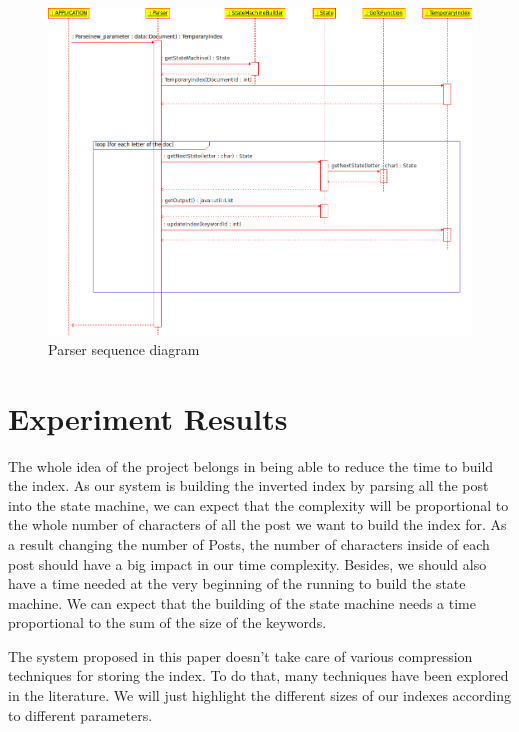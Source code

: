 \documentclass[10pt]{report}
\begin{document}
\begin{figure}
  \begin{center}
        \includegraphics[width=\textwidth,height=!]{parsersequencediagram}
  \end{center}
  \caption{Parser sequence diagram}
  \label{fig:parsersequencediagram}
\end{figure} 


\section{Experiment Results}
\label{sec:experimentresults}
The whole idea of the project belongs in being able to reduce the time
to build the index. As our system is building the inverted index by
parsing all the post into the state machine, we can expect that the
complexity will be proportional to the whole number of characters of
all the post we want to build the index for. As a result changing the
number of Posts, the number of characters inside of each post should
have a big impact in our time complexity. Besides, we should also have
a time needed at the very beginning of the running to build the state
machine. We can expect that the building of the state machine needs a
time proportional to the sum of the size of the keywords.

The system proposed in this paper doesn’t take care of various
compression techniques for storing the index. To do that, many
techniques have been explored in the literature. We will just
highlight the different sizes of our indexes according to different
parameters.
\end{document}
